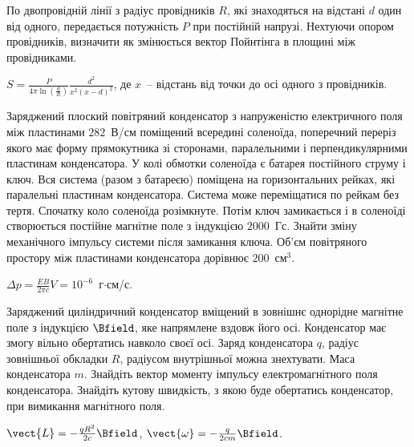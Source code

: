 \begin{problem}
    По двопровідній лінії з радіус провідників $R$, які знаходяться на відстані $d$ один від одного, передається потужність $P$ при постійній напрузі. Нехтуючи опором провідників, визначити як змінюється вектор Пойнтінга в площині між провідниками.
\begin{solution}
	$S  = \frac{P}{4\pi\ln\left( \frac{d}{R} \right) } \frac{d^2}{x^2\left( x - d\right)^2 }$, де $x$~-- відстань від точки до осі одного з провідників.
\end{solution}
\end{problem}


\begin{problem}\label{prb:KRS3.191}
Заряджений плоский повітряний конденсатор з напруженістю електричного поля між пластинами $282$~В/см поміщений всередині соленоїда, поперечний переріз якого має форму прямокутника зі сторонами, паралельними і перпендикулярними пластинам конденсатора. У колі обмотки соленоїда є батарея постійного струму і ключ. Вся система (разом з батареєю) поміщена на горизонтальних рейках, які паралельні пластинам конденсатора. Система може переміщатися по рейкам без тертя. Спочатку коло соленоїда розімкнуте. Потім ключ замикається і в соленоїді створюється постійне магнітне поле з індукцією $2000$~Гс. Знайти зміну механічного імпульсу системи після замикання ключа. Об'єм повітряного простору між пластинами конденсатора дорівнює $200$~см$^3$.
\begin{solution}
	$\Delta p = \frac{EB}{2\pi c}V = 10^{-6}$~г$\cdot$см/с.
\end{solution}
\end{problem}




\begin{problem}%
    Заряджений циліндричний конденсатор вміщений в зовнішнє однорідне магнітне поле з індукцією $ \Bfield $, яке напрямлене вздовж його осі. Конденсатор має змогу вільно обертатись навколо своєї осі. Заряд конденсатора $ q $, радіус зовнішньої обкладки $ R $, радіусом внутрішньої можна знехтувати.  Маса конденсатора $ m $. Знайдіть вектор моменту імпульсу електромагнітного поля конденсатора. Знайдіть кутову швидкість, з якою буде обертатись конденсатор, при вимикання магнітного поля.
\begin{solution}
    $ \vect{L} =  -\frac{q R^2}{2c}\Bfield $, $ \vect{\omega} = -\frac{q}{2c m}\Bfield $.
\end{solution}
\end{problem}



